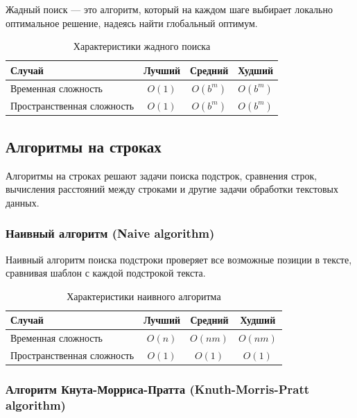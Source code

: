\documentclass[a4paper,12pt]{article}
\begin{document}
Жадный поиск --- это алгоритм, который на каждом шаге выбирает локально оптимальное решение, надеясь найти глобальный оптимум.

\begin{table}[H]
    \centering
    \begin{tabular}{|l|c|c|c|}
        \hline
        Случай & Лучший & Средний & Худший \\
        \hline
        Временная сложность & $O(1)$ & $O(b^m)$ & $O(b^m)$ \\
        \hline
        Пространственная сложность & $O(1)$ & $O(b^m)$ & $O(b^m)$ \\
        \hline
    \end{tabular}
    \caption{Характеристики жадного поиска}
\end{table}

\subsection{Алгоритмы на строках}
\label{subsec:алгоритмы-на-строках}

Алгоритмы на строках решают задачи поиска подстрок, сравнения строк, вычисления расстояний между строками и другие задачи обработки текстовых данных.

\subsubsection{Наивный алгоритм (Naive algorithm)}
\label{subsubsec:наивный-алгоритм-naive-algorithm}

Наивный алгоритм поиска подстроки проверяет все возможные позиции в тексте, сравнивая шаблон с каждой подстрокой текста.

\begin{table}[H]
    \centering
    \begin{tabular}{|l|c|c|c|}
        \hline
        Случай & Лучший & Средний & Худший \\
        \hline
        Временная сложность & $O(n)$ & $O(nm)$ & $O(nm)$ \\
        \hline
        Пространственная сложность & $O(1)$ & $O(1)$ & $O(1)$ \\
        \hline
    \end{tabular}
    \caption{Характеристики наивного алгоритма}
\end{table}

\subsubsection{Алгоритм Кнута-Морриса-Пратта (Knuth-Morris-Pratt algorithm)}
\label{subsubsec:алгоритм-кнута-морриса-пратта-knuth-morris-pratt-algorithm}
\end{document}
